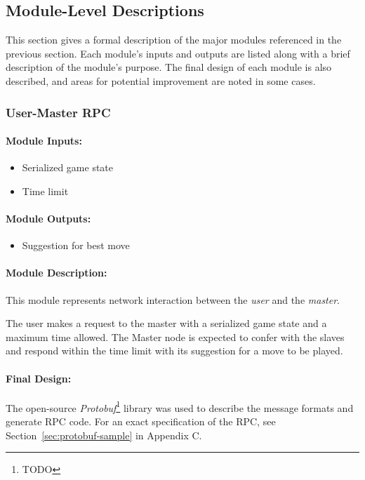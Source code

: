 \documentclass[pdftex,12pt,a4paper]{article}
\begin{document}
%
%
\subsection{Module-Level Descriptions}\label{sec:modules}

This section gives a formal description of the major modules referenced in the previous section. Each module's inputs and outputs are listed along with a brief description of the module's purpose. The final design of each module is also described, and areas for potential improvement are noted in some cases.

\subsubsection{User-Master RPC}

\paragraph{Module Inputs:}
\begin{itemize}
\item Serialized game state
\item Time limit
\end{itemize}

\paragraph{Module Outputs:}
\begin{itemize}
\item Suggestion for best move
\end{itemize}

\paragraph{Module Description:\\}
This module represents network interaction between the \emph{user} and the \emph{master}.

The user makes a request to the master with a serialized game state and a maximum time allowed. The Master node is expected to confer with the slaves and respond within the time limit with its suggestion for a move to be played.

\paragraph{Final Design:\\}
The open-source \emph{Protobuf}\footnote{TODO} library was used to describe the message formats and generate RPC code. For an exact specification of the RPC, see Section~\ref{sec:protobuf-sample} in Appendix C.
\end{document}
